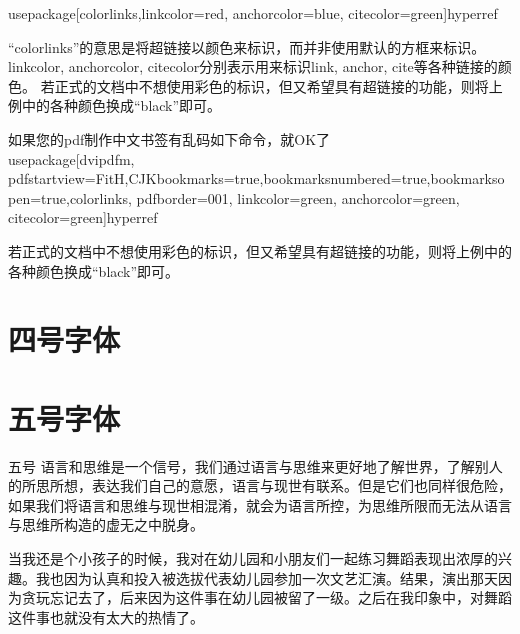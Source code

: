 \documentclass[11pt,a4paper]{article}
\newcommand{\asong}{\CJKfamily{asong}}
\newcommand{\wuhao}{\fontsize{10.5pt}{10.5pt}\selectfont}
\begin{document}
 usepackage[colorlinks,linkcolor=red, anchorcolor=blue, citecolor=green]{hyperref}

“colorlinks”的意思是将超链接以颜色来标识，而并非使用默认的方框来标识。
linkcolor, anchorcolor, citecolor分别表示用来标识link, anchor, cite等各种链接的颜色。
若正式的文档中不想使用彩色的标识，但又希望具有超链接的功能，则将上例中的各种颜色换成“black”即可。

如果您的pdf制作中文书签有乱码如下命令，就OK了
\\usepackage[dvipdfm,  pdfstartview=FitH,CJKbookmarks=true,bookmarksnumbered=true,bookmarksopen=true,colorlinks, pdfborder=001, linkcolor=green,  anchorcolor=green, citecolor=green]{hyperref}

 若正式的文档中不想使用彩色的标识，但又希望具有超链接的功能，则将上例中的各种颜色换成“black”即可。
 


\section{四号字体}
\wuhao {四号
“书籍是世界珍贵的财富，是世世代代和一切国家最好的继承。最古老和最优秀的书籍自然而然地、合情合理地占据着每一所房子里的书架。它们没有自己的利益与诉求，但是在它们给读者以启迪和激励的时候，读者的常识使他不会拒绝书籍。在任何一个社会中，书籍的作者者是天生的极富魅力的精英分子，对人类发挥着比帝王们更大的影响 。当目不识丁的、也许还是鄙视一切的商人，通过魄力和勤奋挣得了垂涎已久的闲暇和衣食无忧的生活，进入了财富和时尚的圈子 以后，最终不可避免地会转向那更高的然而却难以企及的知识和财富的圈子，这时他才会意识到自己文化的残缺，以及他一切财富的空虚无用；于是他不遗余力地要使子女获得知识文化，他深刻地感到自己这方面的不足，从而证明了他的明智；就这样，他成了一个家族的缔造者。”}
\section{五号字体}

\wuhao  \asong 五号
 语言和思维是一个信号，我们通过语言与思维来更好地了解世界，了解别人的所思所想，表达我们自己的意愿，语言与现世有联系。但是它们也同样很危险，如果我们将语言和思维与现世相混淆，就会为语言所控，为思维所限而无法从语言与思维所构造的虚无之中脱身。
\clearpage
\wuhao

﻿当我还是个小孩子的时候，我对在幼儿园和小朋友们一起练习舞蹈表现出浓厚的兴趣。我也因为认真和投入被选拔代表幼儿园参加一次文艺汇演。结果，演出那天因为贪玩忘记去了，后来因为这件事在幼儿园被留了一级。之后在我印象中，对舞蹈这件事也就没有太大的热情了。﻿﻿
\end{document}
